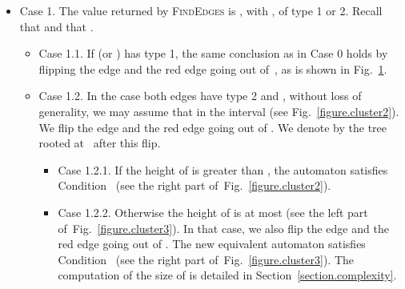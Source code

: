 \documentclass[11pt,a4paper]{article}
\newcommand{\ie}{{\itshape i.e.}\xspace }
\begin{document}
\begin{itemize}
\begin{figure}[htbp]
{\begin{VCPicture}{(0,-1)(12,13)}
{{}
}
\end{VCPicture}}
        \caption{The picture on the left illustrates Case 1.1.
          The edge  if of type 1. After flipping the
          edge  and the red edge going out of , we
          get the automaton on the right. It satisfies the
          Condition~, \ie it has a unique maximal tree (here
          rooted at ). Maximal states are colored and the (dashed)
          -edges of the automaton are not all
          represented.}\label{figure.cluster1}
\end{figure}
\item Case 1. The value returned by \textsc{FindEdges} is
, with ,  of
type 1 or 2. Recall that  and that .
\begin{itemize}
\item Case 1.1. If  (or ) has type 1, the same
conclusion as in Case 0 holds by flipping the edge  and the red edge
going out of~, as is shown in Fig.~\ref{figure.cluster1}.
\item Case 1.2. In the case both edges  have type 2 and , without loss of generality, we may assume that  in the interval  (see Fig.~\ref{figure.cluster2}).  We
      flip the edge  and the red edge going out of
      .  We denote by  the tree rooted at~ after this
      flip.
\begin{itemize}
\item Case 1.2.1.
If the height of 
    is greater than , the automaton satisfies Condition~ (see
    the right part of~Fig.~\ref{figure.cluster2}). 
\item Case 1.2.2.  Otherwise the height of  is at most 
  (see the left part of~Fig.~\ref{figure.cluster3}).  In that case,
  we also flip the edge  and the red edge going out of
  . The new equivalent automaton satisfies Condition~ (see
  the right part of~Fig.~\ref{figure.cluster3}).  The computation of
  the size of  is detailed in Section~\ref{section.complexity}.
\end{itemize}


\end{itemize}
\end{itemize}
\end{document}
